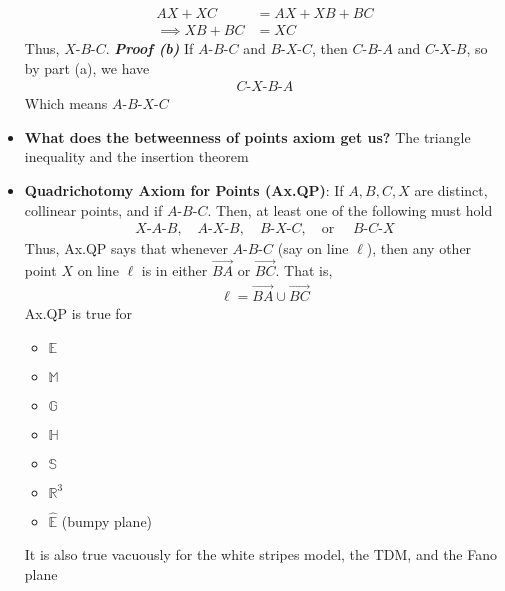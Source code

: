 \documentclass{report}
\begin{document}
\begin{itemize}
\begin{align*}
                AX + XC &= AX + XB + BC \\
                \implies XB + BC &= XC
            \end{align*}
            Thus, $ X\text{-}B\text{-}C $.
            \bigbreak \noindent 
            \textbf{\textit{Proof (b)}} If $ A\text{-}B\text{-}C$ and $ B\text{-}X\text{-}C$, then $ C\text{-}B\text{-}A$ and $ C\text{-}X\text{-}B $, so by part (a), we have
            \begin{align*}
                C\text{-}X\text{-}B\text{-}A
            \end{align*}
            Which means $ A\text{-}B\text{-}X\text{-}C$ \endpf
        \item \textbf{What does the betweenness of points axiom get us?} The triangle inequality and the insertion theorem 
        \item \textbf{Quadrichotomy Axiom for Points (Ax.QP)}: If $A,B,C,X$ are distinct, collinear points, and if $ A\text{-}B\text{-}C$. Then, at least one of the following must hold
            \begin{align*}
                X\text{-}A\text{-}B, \quad A\text{-}X\text{-}B, \quad B\text{-}X\text{-}C, \quad \text{or } \quad B\text{-}C\text{-}X
            \end{align*}
            \bigbreak \noindent 
            Thus, Ax.QP says that whenever $ A\text{-}B\text{-}C$ (say on line $\ell$), then any other point $X$ on line $\ell$ is in either $ \overrightarrow{BA} $ or $ \overrightarrow{BC} $. That is,
            \begin{align*}
                \ell = \overrightarrow{BA} \cup \overrightarrow{BC}
            \end{align*}
            \bigbreak \noindent 
            Ax.QP is true for
            \begin{itemize}
                \item $\mathbb{E}$
                \item $\mathbb{M}$
                \item $\mathbb{G}$
                \item $\mathbb{H}$
                \item $\mathbb{S}$
                \item $\mathbb{R}^{3}$
                \item $\hat{\mathbb{E}}$ (bumpy plane)
            \end{itemize}
            It is also true vacuously for the white stripes model, the TDM, and the Fano plane

\end{itemize}
\end{document}
